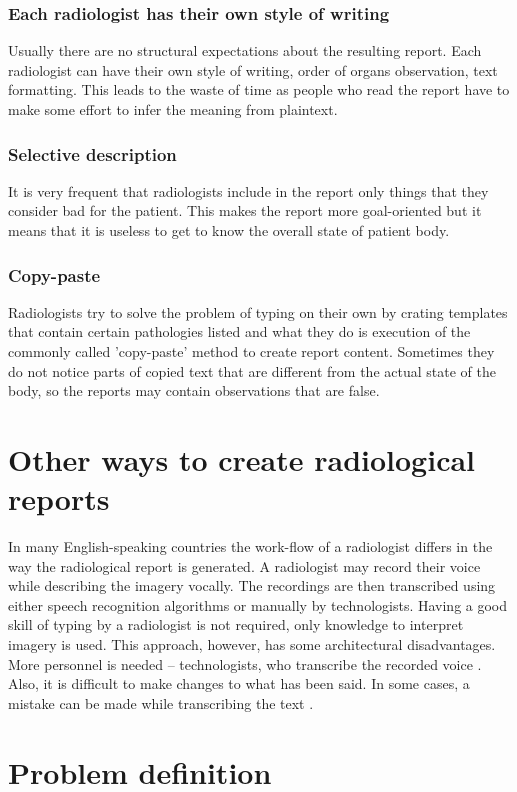 \documentclass[12pt, twoside, openany]{report}
\theoremstyle{definition}
\begin{document}
\subsubsection{Each radiologist has their own style of writing}
Usually there are no structural expectations about the resulting report. Each radiologist can have their own style of writing, order of organs observation, text formatting. This leads to the waste of time as people who read the report have to make some effort to infer the meaning from plaintext. 
\subsubsection{Selective description}
It is very frequent that radiologists include in the report only things that they consider bad for the patient. This makes the report more goal-oriented but it means that it is useless to get to know the overall state of patient body.
\subsubsection{Copy-paste}
Radiologists try to solve the problem of typing on their own by crating templates that contain certain pathologies listed and what they do is execution of the commonly called 'copy-paste' method to create report content. Sometimes they do not notice parts of copied text that are different from the actual state of the body, so the reports may contain observations that are false. 

\section{Other ways to create radiological reports}
In many English-speaking countries the work-flow of a radiologist differs in the way the radiological report is generated. A radiologist may record their voice while describing the imagery vocally. The recordings are then transcribed using either speech recognition algorithms or manually by technologists. Having a good skill of typing by a radiologist is not required, only knowledge to interpret imagery is used. This approach, however, has some architectural disadvantages. More personnel is needed -- technologists, who transcribe the recorded voice \cite{speech-impact}. Also, it is difficult to make changes to what has been said. In some cases, a mistake can be made while transcribing the text \cite{speech-africa}.

\section{Problem definition}
\end{document}
